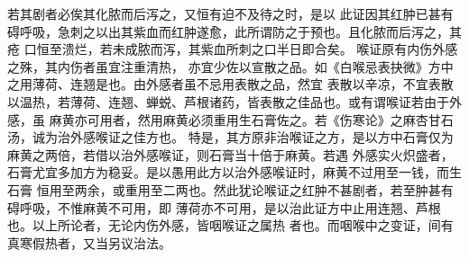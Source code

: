 \documentclass[a4paper,12pt,UTF8,twoside]{ctexbook}
\begin{document}
若其剧者必俟其化脓而后泻之，又恒有迫不及待之时，是以 
此证因其红肿已甚有碍呼吸，急刺之以出其紫血而红肿遂愈，此所谓防之于预也。且化脓而后泻之，其疮 
口恒至溃烂，若未成脓而泻，其紫血所刺之口半日即合矣。 
喉证原有内伤外感之殊，其内伤者虽宜注重清热， 
亦宜少佐以宣散之品。如《白喉忌表抉微》方中之用薄荷、连翘是也。由外感者虽不忌用表散之品，然宜 
表散以辛凉，不宜表散以温热，若薄荷、连翘、蝉蜕、芦根诸药，皆表散之佳品也。或有谓喉证若由于外感，虽 
麻黄亦可用者，然用麻黄必须重用生石膏佐之。若《伤寒论》之麻杏甘石汤，诚为治外感喉证之佳方也。 
特是，其方原非治喉证之方，是以方中石膏仅为麻黄之两倍，若借以治外感喉证，则石膏当十倍于麻黄。若遇 
外感实火炽盛者，石膏尤宜多加方为稳妥。是以愚用此方以治外感喉证时，麻黄不过用至一钱，而生石膏 
恒用至两余，或重用至二两也。然此犹论喉证之红肿不甚剧者，若至肿甚有碍呼吸，不惟麻黄不可用，即 
薄荷亦不可用，是以治此证方中止用连翘、芦根也。以上所论者，无论内伤外感，皆咽喉证之属热 
者也。而咽喉中之变证，间有真寒假热者，又当另议治法。 
\end{document}
